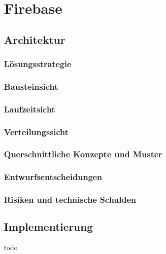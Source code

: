 \chapter{Firebase}

\section{Architektur}

\subsection{Lösungsstrategie}

\subsection{Bausteinsicht}

\subsection{Laufzeitsicht}

\subsection{Verteilungssicht}

\subsection{Querschnittliche Konzepte und Muster}

\subsection{Entwurfsentscheidungen}

\subsection{Risiken und technische Schulden}

\section{Implementierung}

todo